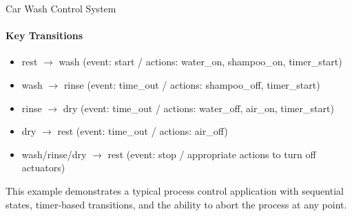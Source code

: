 \begin{example2}{Car Wash Control System}
\paragraph{Key Transitions}
\begin{itemize}
    \item rest $\rightarrow$ wash (event: start / actions: water\_on, shampoo\_on, timer\_start)
    \item wash $\rightarrow$ rinse (event: time\_out / actions: shampoo\_off, timer\_start)
    \item rinse $\rightarrow$ dry (event: time\_out / actions: water\_off, air\_on, timer\_start)
    \item dry $\rightarrow$ rest (event: time\_out / actions: air\_off)
    \item wash/rinse/dry $\rightarrow$ rest (event: stop / appropriate actions to turn off actuators)
\end{itemize}

This example demonstrates a typical process control application with sequential states, timer-based transitions, and the ability to abort the process at any point.
\end{example2}

